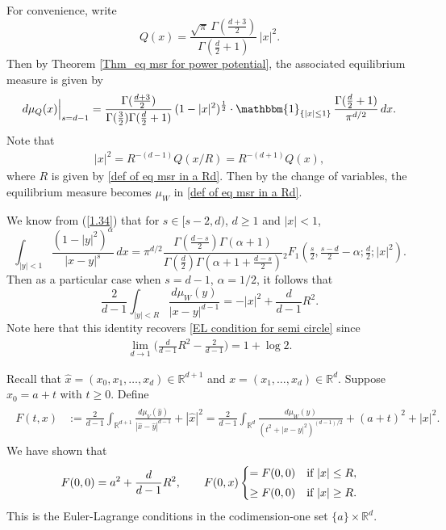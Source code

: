 \documentclass[10pt]{amsart}
\def\R{\mathbb{R}}
\theoremstyle{plain}
\theoremstyle{remark}
\numberwithin{equation}{section}
\begin{document}
For convenience, write  
\begin{equation}
Q(x) =   \frac{ \sqrt{\pi} \, \Gamma(\frac{d+3}{2})   }{ \Gamma(\frac{d}{2}+1)  } \,       |x|^{2}. 
\end{equation}
Then by Theorem \ref{Thm_eq msr for power potential}, the associated equilibrium measure is given by 
\begin{equation}
 d\mu_Q(x)\Big|_{s=d-1} = \frac{ \Gamma( \frac{d+3}{2}) }{ \Gamma(\frac32)\Gamma(\frac{d}{2}+1) } \,  (1-|x|^2)^{ \frac12 }  \cdot  \mathbbm{1}_{ \{ |x| \le 1 \} } \, \frac{ \Gamma(\frac{d}{2}+1) }{\pi^{ d/2 }}\,dx.    
\end{equation}
Note that  
\begin{align*}
|x|^2= R^{-(d-1)} Q(x/R) = R^{-(d+1)}Q(x), 
\end{align*} 
where $R$ is given by \eqref{def of eq msr in a Rd}. 
Then by the change of variables, the equilibrium measure becomes $\mu_W$ in \eqref{def of eq msr in a Rd}. 

We know from (\ref{1.34}) that for $s \in [s-2,d)$, $d \ge 1$ and $|x|<1$,
\begin{equation} \label{3.19}
\int_{ |y|<1 } \frac{ (1-|y|^2)^{\alpha} }{ |x-y|^s }\,dx =  \pi^{d/2}  \frac{ \Gamma(\frac{d-s}{2}) \Gamma(\alpha+1) }{ \Gamma( \frac{d}{2} ) \Gamma(\alpha+1+\frac{d-s}{2}) }   {}_2F_1(\tfrac{s}{2},\tfrac{s-d}{2}-\alpha;\tfrac{d}{2};|x|^2). 
 \end{equation} 
Then as a particular case when $s=d-1$, $\alpha=1/2$, it follows that  
\begin{equation}
\frac{2}{d-1} \int_{ |y|<R } \frac{ d\mu_W(y) }{ |x-y|^{d-1} } = - |x|^2+ \frac{d}{d-1} R^2. 
\end{equation} 
Note here that this identity recovers \eqref{EL condition for semi circle} since  
\begin{align*}
\lim_{d \to 1} \Big( \frac{d}{d-1} R^2- \frac{ 2 }{ d-1 } \Big) = 1+\log 2 .
\end{align*}
 
Recall that  $\hat{x}=(x_0,x_1,\dots,x_d) \in \R^{d+1}$ and $x=(x_1,\dots,x_d) \in \R^d.$
Suppose $x_0=a+t$ with $t\ge0$.
Define 
\begin{align}
\begin{split} \label{def of F(t,x)}
F(t,x)&:= \frac{2}{d-1} \int_{ \R^{d+1} } \frac{ d\mu_V(\hat{y}) }{ |\hat{x}-\hat{y}|^{d-1} } +|\hat{x}|^2   
=\frac{2}{d-1}\int_{ \R^d } \frac{ d\mu_W(y) }{ ( t^2+|x-y|^2 )^{(d-1)/2} }+(a+t)^2+|x|^2. 
\end{split}
\end{align} 
We have shown that  
\begin{equation}
F(0,0)= a^2+  \frac{d}{d-1} R^2, \qquad F(0,x) \begin{cases}
= F(0,0) & \textup{if } |x| \le R,
\smallskip 
\\
\ge F(0,0) & \textup{if } |x| \ge R. 
\end{cases}  
\end{equation}
This is the Euler-Lagrange conditions in the  codimension-one set \( \{a\} \times \mathbb{R}^d \). 
 
\end{document}

